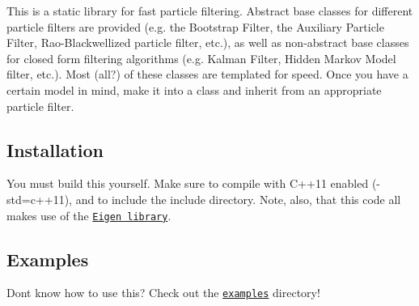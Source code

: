 This is a static library for fast particle filtering. Abstract base classes for different particle filters are provided (e.\+g. the Bootstrap Filter, the Auxiliary Particle Filter, Rao-\/\+Blackwellized particle filter, etc.), as well as non-\/abstract base classes for closed form filtering algorithms (e.\+g. Kalman Filter, Hidden Markov Model filter, etc.). Most (all?) of these classes are templated for speed. Once you have a certain model in mind, make it into a class and inherit from an appropriate particle filter.

\subsection*{Installation}

You must build this yourself. Make sure to compile with C++11 enabled ({\ttfamily -\/std=c++11}), and to include the {\ttfamily include} directory. Note, also, that this code all makes use of the \href{http://eigen.tuxfamily.org/}{\tt Eigen library}.

\subsection*{Examples}

Don\textquotesingle{}t know how to use this? Check out the \href{https://github.com/tbrown122387/pf/tree/master/examples}{\tt {\ttfamily examples}} directory! 